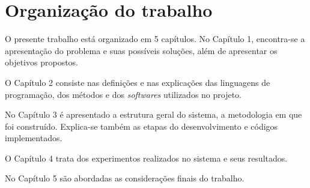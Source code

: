 
\section{Organização do trabalho}

O presente trabalho está organizado em 5 capítulos. No Capítulo 1, encontra-se
a apresentação do problema e suas possíveis soluções, além de apresentar os objetivos
propostos.

O Capítulo 2 consiste nas definições e nas explicações das linguagens de programação, dos métodos e dos \textit{softwares} utilizados no projeto.

No Capítulo 3 é apresentado a estrutura geral do sistema, a metodologia em que foi construído. Explica-se também as etapas do desenvolvimento e códigos implementados.

O Capítulo 4 trata dos experimentos realizados no sistema e seus resultados.

No Capítulo 5 são abordadas as considerações finais do trabalho.